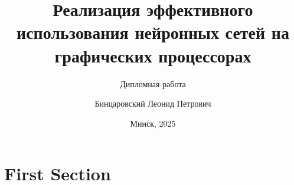 \documentclass[aspectratio=169,xcolor=dvipsnames]{beamer}
\title{Реализация эффективного использования нейронных сетей на графических процессорах}
\subtitle{Дипломная работа}
\author[Pin-Yen] {Бинцаровский Леонид Петрович}
\institute[NTU] %
{
    Белорусский государственный университет\\
    ФПМИ, ДМА, 4 курс\\
    руководитель: старший преподаватель Пирштук Д. И.
    \vskip 3pt
}
\date{Минск, 2025} %
\begin{document}
\begin{frame}
    \titlepage
\end{frame}


\section{First Section}
\end{document}
